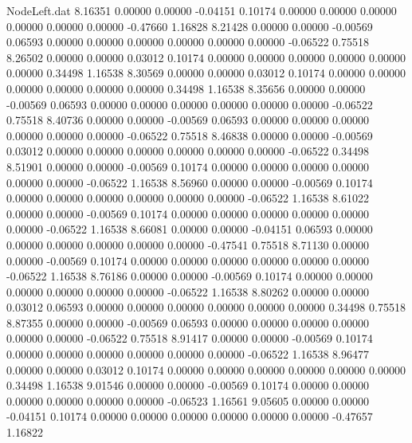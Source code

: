 \begin{filecontents}{NodeLeft.dat}
   8.16351    0.00000    0.00000    -0.04151    0.10174    0.00000    0.00000    0.00000    0.00000    0.00000    0.00000   -0.47660    1.16828
   8.21428    0.00000    0.00000    -0.00569    0.06593    0.00000    0.00000    0.00000    0.00000    0.00000    0.00000   -0.06522    0.75518
   8.26502    0.00000    0.00000     0.03012    0.10174    0.00000    0.00000    0.00000    0.00000    0.00000    0.00000    0.34498    1.16538
   8.30569    0.00000    0.00000     0.03012    0.10174    0.00000    0.00000    0.00000    0.00000    0.00000    0.00000    0.34498    1.16538
   8.35656    0.00000    0.00000    -0.00569    0.06593    0.00000    0.00000    0.00000    0.00000    0.00000    0.00000   -0.06522    0.75518
   8.40736    0.00000    0.00000    -0.00569    0.06593    0.00000    0.00000    0.00000    0.00000    0.00000    0.00000   -0.06522    0.75518
   8.46838    0.00000    0.00000    -0.00569    0.03012    0.00000    0.00000    0.00000    0.00000    0.00000    0.00000   -0.06522    0.34498
   8.51901    0.00000    0.00000    -0.00569    0.10174    0.00000    0.00000    0.00000    0.00000    0.00000    0.00000   -0.06522    1.16538
   8.56960    0.00000    0.00000    -0.00569    0.10174    0.00000    0.00000    0.00000    0.00000    0.00000    0.00000   -0.06522    1.16538
   8.61022    0.00000    0.00000    -0.00569    0.10174    0.00000    0.00000    0.00000    0.00000    0.00000    0.00000   -0.06522    1.16538
   8.66081    0.00000    0.00000    -0.04151    0.06593    0.00000    0.00000    0.00000    0.00000    0.00000    0.00000   -0.47541    0.75518
   8.71130    0.00000    0.00000    -0.00569    0.10174    0.00000    0.00000    0.00000    0.00000    0.00000    0.00000   -0.06522    1.16538
   8.76186    0.00000    0.00000    -0.00569    0.10174    0.00000    0.00000    0.00000    0.00000    0.00000    0.00000   -0.06522    1.16538
   8.80262    0.00000    0.00000     0.03012    0.06593    0.00000    0.00000    0.00000    0.00000    0.00000    0.00000    0.34498    0.75518
   8.87355    0.00000    0.00000    -0.00569    0.06593    0.00000    0.00000    0.00000    0.00000    0.00000    0.00000   -0.06522    0.75518
   8.91417    0.00000    0.00000    -0.00569    0.10174    0.00000    0.00000    0.00000    0.00000    0.00000    0.00000   -0.06522    1.16538
   8.96477    0.00000    0.00000     0.03012    0.10174    0.00000    0.00000    0.00000    0.00000    0.00000    0.00000    0.34498    1.16538
   9.01546    0.00000    0.00000    -0.00569    0.10174    0.00000    0.00000    0.00000    0.00000    0.00000    0.00000   -0.06523    1.16561
   9.05605    0.00000    0.00000    -0.04151    0.10174    0.00000    0.00000    0.00000    0.00000    0.00000    0.00000   -0.47657    1.16822

\end{filecontents}
